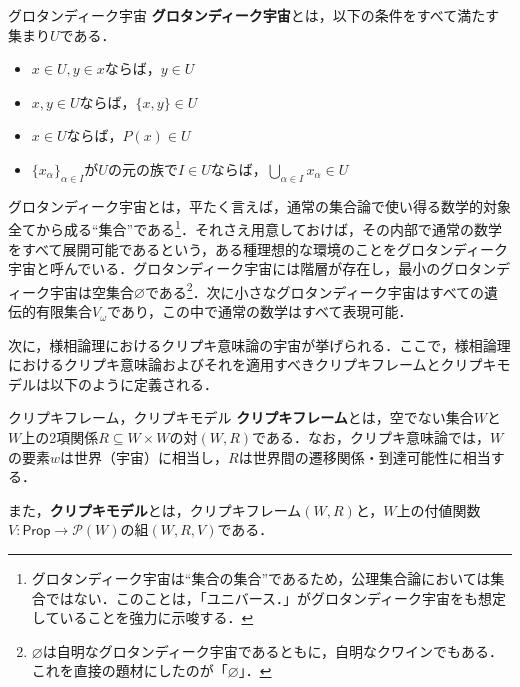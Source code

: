 \documentclass[10pt, a5paper, twoside]{ltjsarticle}
\begin{document}
            \begin{dfn}{グロタンディーク宇宙}{}
                \textbf{グロタンディーク宇宙}とは，以下の条件をすべて満たす集まり$U$である．

                \begin{itemize}
                    \item $x \in U, y \in x$ならば，$y \in U$
                    \item $x, y \in U$ならば，$\{ x, y \} \in U$
                    \item $x \in U$ならば，$P(x) \in U$
                    \item $\{ x_\alpha \}_{\alpha \in I}$が$U$の元の族で$I \in U$ならば，$\bigcup_{\alpha \in I} x_\alpha \in U$
                \end{itemize}
            \end{dfn}

            グロタンディーク宇宙とは，平たく言えば，通常の集合論で使い得る数学的対象全てから成る“集合”である\footnote{グロタンディーク宇宙は“集合の集合”であるため，公理集合論においては集合ではない．このことは，「ユニバース．」がグロタンディーク宇宙をも想定していることを強力に示唆する．}．それさえ用意しておけば，その内部で通常の数学をすべて展開可能であるという，ある種理想的な環境のことをグロタンディーク宇宙と呼んでいる．グロタンディーク宇宙には階層が存在し，最小のグロタンディーク宇宙は空集合$\varnothing$である\footnote{$\varnothing$は自明なグロタンディーク宇宙であるともに，自明なクワインでもある．これを直接の題材にしたのが「$\varnothing$」．}．次に小さなグロタンディーク宇宙はすべての遺伝的有限集合$V_\omega$であり，この中で通常の数学はすべて表現可能．

            次に，様相論理におけるクリプキ意味論の宇宙が挙げられる．ここで，様相論理におけるクリプキ意味論およびそれを適用すべきクリプキフレームとクリプキモデルは以下のように定義される\cite{yoso}．

            \begin{dfn}{クリプキフレーム，クリプキモデル}{}
                \textbf{クリプキフレーム}とは，空でない集合$W$と$W$上の2項関係$R \subseteq W \times W$の対$(W, R)$である．なお，クリプキ意味論では，$W$の要素$w$は世界（宇宙）に相当し，$R$は世界間の遷移関係・到達可能性に相当する．

                また，\textbf{クリプキモデル}とは，クリプキフレーム$(W, R)$と，$W$上の付値関数$V: \textsf{Prop} \to \mathcal{P}(W)$の組$(W, R, V)$である．
            \end{dfn}
\end{document}

